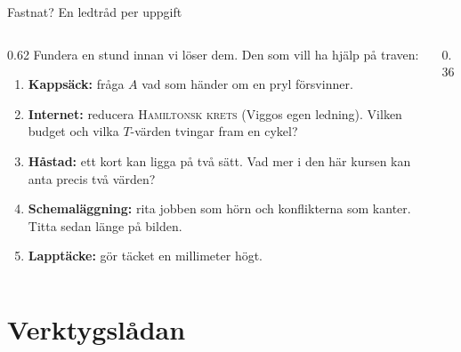 \documentclass[aspectratio=169,10pt]{beamer}
\newcommand{\prob}[1]{\textsc{#1}}
\begin{document}
\begin{frame}{Fastnat? En ledtråd per uppgift}
  \begin{columns}[T]
    \begin{column}{0.62\textwidth}
      Fundera en stund innan vi löser dem. Den som vill ha hjälp på traven:
      \begin{enumerate}
        \item<2-> \textbf{Kappsäck:} fråga $A$ vad som händer om en pryl försvinner.
        \item<3-> \textbf{Internet:} reducera \prob{Hamiltonsk krets} (Viggos egen ledning). Vilken budget och vilka $T$-värden tvingar fram en cykel?
        \item<4-> \textbf{Håstad:} ett kort kan ligga på två sätt. Vad mer i den här kursen kan anta precis två värden?
        \item<5-> \textbf{Schemaläggning:} rita jobben som hörn och konflikterna som kanter. Titta sedan länge på bilden.
        \item<6-> \textbf{Lapptäcke:} gör täcket en millimeter högt.
      \end{enumerate}
    \end{column}
    \begin{column}{0.36\textwidth}
    \end{column}
  \end{columns}
\end{frame}

\section{Verktygslådan}
\end{document}
